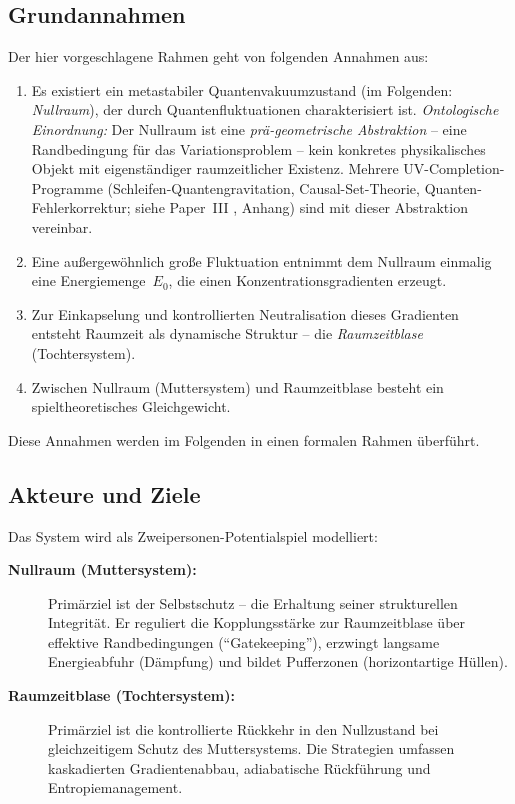 \documentclass[aps,prd,twocolumn,superscriptaddress,nofootinbib]{revtex4-2}
\begin{document}
\subsection{Grundannahmen}
\label{subsec:grundannahmen}

Der hier vorgeschlagene Rahmen geht von folgenden Annahmen aus:

\begin{enumerate}
\item Es existiert ein metastabiler Quantenvakuumzustand (im Folgenden: \textit{Nullraum}), der durch Quantenfluktuationen charakterisiert ist. \textit{Ontologische Einordnung:} Der Nullraum ist eine \emph{pr\"a-geometrische Abstraktion} -- eine Randbedingung f\"ur das Variationsproblem -- kein konkretes physikalisches Objekt mit eigenst\"andiger raumzeitlicher Existenz. Mehrere UV-Completion-Programme (Schleifen-Quantengravitation, Causal-Set-Theorie, Quanten-Fehlerkorrektur; siehe Paper~III \cite{Geiger2026c}, Anhang) sind mit dieser Abstraktion vereinbar.
\item Eine au\ss{}ergew\"ohnlich gro\ss{}e Fluktuation entnimmt dem Nullraum einmalig eine Energiemenge~$E_0$, die einen Konzentrationsgradienten erzeugt.
\item Zur Einkapselung und kontrollierten Neutralisation dieses Gradienten entsteht Raumzeit als dynamische Struktur -- die \textit{Raumzeitblase} (Tochtersystem).
\item Zwischen Nullraum (Muttersystem) und Raumzeitblase besteht ein spieltheoretisches Gleichgewicht.
\end{enumerate}

Diese Annahmen werden im Folgenden in einen formalen Rahmen \"uberf\"uhrt.

\subsection{Akteure und Ziele}
\label{subsec:akteure}

Das System wird als Zweipersonen-Potentialspiel modelliert:

\begin{description}
\item[\textbf{Nullraum (Muttersystem):}] Prim\"arziel ist der Selbstschutz -- die Erhaltung seiner strukturellen Integrit\"at. Er reguliert die Kopplungsst\"arke zur Raumzeitblase \"uber effektive Randbedingungen (``Gatekeeping''), erzwingt langsame Energieabfuhr (D\"ampfung) und bildet Pufferzonen (horizontartige H\"ullen).
\item[\textbf{Raumzeitblase (Tochtersystem):}] Prim\"arziel ist die kontrollierte R\"uckkehr in den Nullzustand bei gleichzeitigem Schutz des Muttersystems. Die Strategien umfassen kaskadierten Gradientenabbau, adiabatische R\"uckf\"uhrung und Entropiemanagement.
\end{description}
\end{document}
